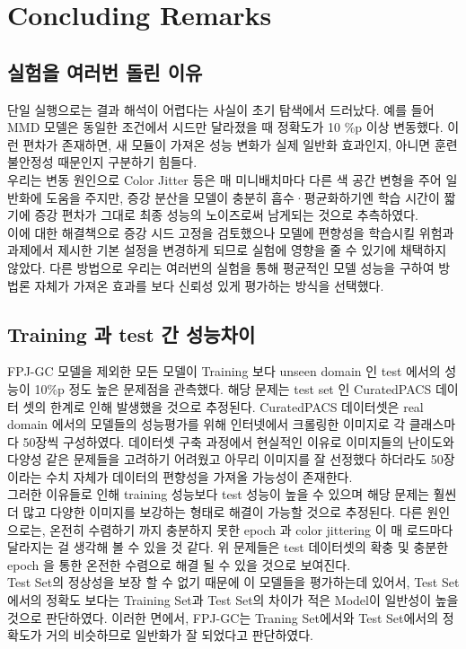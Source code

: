 
\section{Concluding Remarks}
\subsection{실험을 여러번 돌린 이유}
단일 실행으로는 결과 해석이 어렵다는 사실이 초기 탐색에서 드러났다.
예를 들어 MMD 모델은 동일한 조건에서 시드만 달라졌을 때 정확도가 10 \%p 이상 변동했다. 
이런 편차가 존재하면, 새 모듈이 가져온 성능 변화가 실제 일반화 효과인지, 아니면 훈련 
불안정성 때문인지 구분하기 힘들다.\\
우리는 변동 원인으로 Color Jitter 등은 매 미니배치마다 다른 색 공간 변형을 주어 
일반화에 도움을 주지만, 증강 분산을 모델이 충분히 흡수·평균화하기엔 학습 시간이 짧기에 
증강 편차가 그대로 최종 성능의 노이즈로써 남게되는 것으로 추측하였다.\\
이에 대한 해결책으로 증강 시드 고정을 검토했으나 모델에 편향성을 학습시킬 위험과 과제에서 제시한 
기본 설정을 변경하게 되므로 실험에 영향을 줄 수 있기에 채택하지 않았다. 다른 방법으로 
우리는 여러번의 실험을 통해 평균적인 모델 성능을 구하여 방법론 자체가 가져온 효과를 보다 
신뢰성 있게 평가하는 방식을 선택했다.

\subsection{Training 과 test 간 성능차이}
FPJ-GC 모델을 제외한 모든 모델이 Training 보다 unseen domain 인 test 에서의 성능이 10\%p 
정도 높은 문제점을 관측했다. 해당 문제는 test set 인 CuratedPACS 데이터 셋의 한계로 인해 발생했을 것으로 추정된다. 
CuratedPACS 데이터셋은 real domain 에서의 모델들의 성능평가를 위해 인터넷에서 크롤링한 이미지로 각 클래스마다 
50장씩 구성하였다. 데이터셋 구축 과정에서 현실적인 이유로 이미지들의 난이도와 다양성 같은 문제들을 고려하기 어려웠고 
아무리 이미지를 잘 선정했다 하더라도 50장이라는 수치 자체가 데이터의 편향성을 가져올 가능성이 존재한다.\\
그러한 이유들로 인해 training 성능보다 test 성능이 높을 수 있으며 해당 문제는 훨씬 더 많고 다양한 이미지를 보강하는 
형태로 해결이 가능할 것으로 추정된다. 다른 원인으로는, 온전히 수렴하기 까지 충분하지 못한 epoch 과 color jittering 이 
매 로드마다 달라지는 걸 생각해 볼 수 있을 것 같다. 위 문제들은 test 데이터셋의 확충 및 충분한 epoch 을 통한 
온전한 수렴으로 해결 될 수 있을 것으로 보여진다.\\
Test Set의 정상성을 보장 할 수 없기 때문에 이 모델들을 평가하는데 있어서, Test Set에서의 정확도 보다는 
Training Set과 Test Set의 차이가 적은 Model이 일반성이 높을것으로 판단하였다. 이러한 면에서, FPJ-GC는 Traning Set에서와 
Test Set에서의 정확도가 거의 비슷하므로 일반화가 잘 되었다고 판단하였다.

